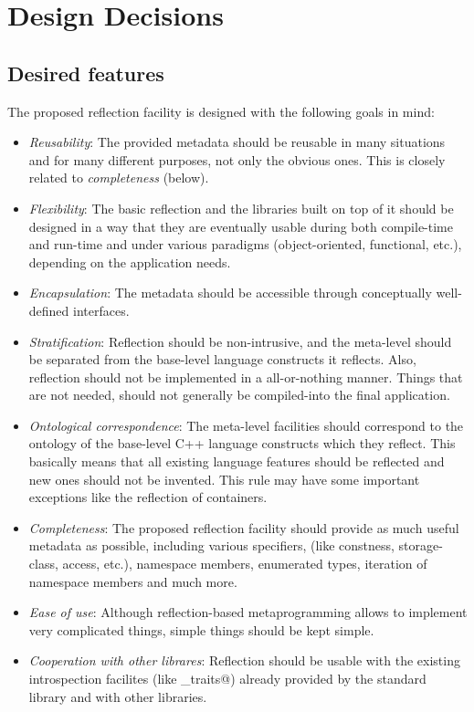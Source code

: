 \section{Design Decisions}

\subsection{Desired features} 

The proposed reflection facility is designed with the following
goals in mind:

\begin{itemize}
\item {\em Reusability}: The provided metadata should be reusable
in many situations and for many different purposes, not only
the obvious ones. This is closely related to {\em completeness} (below).

\item {\em Flexibility}: The basic reflection and the libraries
built on top of it should be designed
in a way that they are eventually usable during both compile-time
and run-time and under various paradigms (object-oriented, functional, etc.),
depending on the application needs.

\item {\em  Encapsulation}: The metadata should be accessible
through conceptually well-defined interfaces.

\item {\em  Stratification}: Reflection should be non-intrusive,
and the meta-level should be separated from the base-level language
constructs it reflects. Also, reflection should not be implemented
in a all-or-nothing manner. Things that are not needed, should not generally
be compiled-into the final application.

\item {\em  Ontological correspondence}: The meta-level facilities should
correspond to the ontology of the base-level C++ language constructs
which they reflect. This basically means that all existing language
features should be reflected and new ones should not be invented.
This rule may have some important exceptions like the reflection of
containers.

\item {\em  Completeness}: The proposed reflection facility should
provide as much useful metadata as possible, including various specifiers,
(like constness, storage-class, access, etc.), namespace members,
enumerated types, iteration of namespace members and much more.

\item {\em  Ease of use}: Although reflection-based metaprogramming
allows to implement very complicated things, simple things
should be kept simple.

\item {\em  Cooperation with other librares}: Reflection should be
usable with the existing introspection facilites (like \verb@type_traits@)
already provided by the standard library and with other libraries.
\end{itemize}

